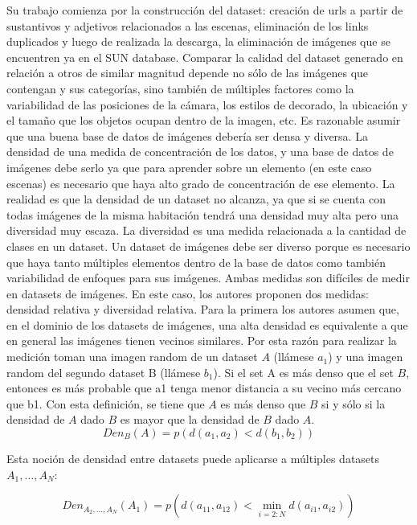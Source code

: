 Su trabajo comienza por la construcción del dataset: creación de urls a partir de sustantivos y adjetivos relacionados a las escenas, eliminación de los links duplicados y luego de realizada la descarga, la eliminación de imágenes que se encuentren ya en el SUN database. Comparar la calidad del dataset generado en relación a otros de similar magnitud depende no sólo de las imágenes que contengan y sus categorías, sino también de múltiples factores como la variabilidad de las posiciones de la cámara, los estilos de decorado, la ubicación y el tamaño que los objetos ocupan dentro de la imagen, etc. Es razonable asumir que una buena base de datos de imágenes debería ser densa y diversa. La densidad de una medida de concentración de los datos, y una base de datos de imágenes debe serlo ya que para aprender sobre un elemento (en este caso escenas) es necesario que haya alto grado de concentración de ese elemento. La realidad es que la densidad de un dataset no alcanza, ya que si se cuenta con todas imágenes de la misma habitación tendrá una densidad muy alta pero una diversidad muy escaza. La diversidad es una medida relacionada a la cantidad de clases en un dataset. Un dataset de imágenes debe ser diverso porque es necesario que haya tanto múltiples elementos dentro de la base de datos como también variabilidad de enfoques para sus imágenes. Ambas medidas son difíciles de medir en datasets de imágenes.
En este caso, los autores proponen dos medidas: densidad relativa y diversidad relativa. Para la primera los autores asumen que, en el dominio de los datasets de imágenes, una alta densidad es equivalente a que en general las imágenes tienen vecinos similares. Por esta razón para realizar la medición toman una imagen random de un dataset \(A\) (llámese \(a_{1}\)) y una imagen random del segundo dataset B (llámese \(b_{1}\)). Si el set A es más denso que el set \(B\), entonces es más probable que a1 tenga menor distancia a su vecino más cercano que b1. Con esta definición, se tiene que \(A\) es más denso que \(B\) si y sólo si la densidad de  \(A\) dado  \(B\) es mayor que la densidad de \(B\) dado \(A\). 
\begin{equation}
{Den}_{B}(A)=p\left(d\left(a_{1}, a_{2}\right)<d\left(b_{1}, b_{2}\right)\right)
\end{equation}

Esta noción de densidad entre datasets puede aplicarse a múltiples datasets \({A_{1}, \ldots, A_{N}}\):

\begin{equation}
{Den}_{A_{2}, \ldots, A_{N}}\left(A_{1}\right)=p\left(d\left(a_{11}, a_{12}\right)<\min _{i=2: N} d\left(a_{i 1}, a_{i 2}\right)\right)
\end{equation}

